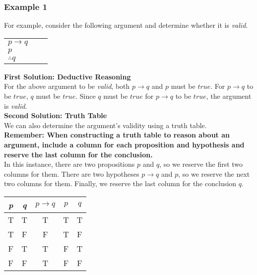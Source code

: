 \subsubsection*{Example 1}

For example, consider the following argument and determine whether it is \textit{valid}.\\

\begin{table}[h]
\centering
\begin{tabular}{l@{\,}l@{\,}l@{\,}}
  $p \rightarrow q$ & & \\
  $p$ & & \\
\hline
 $\therefore q$ & &
\end{tabular}
\end{table}

\textbf{First Solution: Deductive Reasoning}\\

For the above argument to be \textit{valid}, both $p \rightarrow q$ and $p$ must be $true$.  For $p \rightarrow q$ to be $true$, $q$ must be $true$.  Since $q$ must be $true$ for $p \rightarrow q$ to be $true$, the argument is \textit{valid}.\\

\textbf{Second Solution: Truth Table}\\

We can also determine the argument's validity using a truth table.\\

\textbf{Remember: When constructing a truth table to reason about an argument, include a column for each proposition and hypothesis and reserve the last column for the conclusion.}\\

In this instance, there are two propositions $p$ and $q$, so we reserve the first two columns for them.  There are two hypotheses $p \rightarrow q$ and $p$, so we reserve the next two columns for them.  Finally, we reserve the last column for the conclusion $q$.\\

\begin{table}[h]
\centering
\begin{tabular}{cc|cc|c}
\hline
\textit{p} & \textit{q} & $p \rightarrow q$ & $p$ & $q$ \\ \hline
T & T & T & T & T \\ 
T & F & F & T & F \\ 
F & T & T & F & T \\
F & F & T & F & F \\ \hline
\end{tabular}
\end{table}

